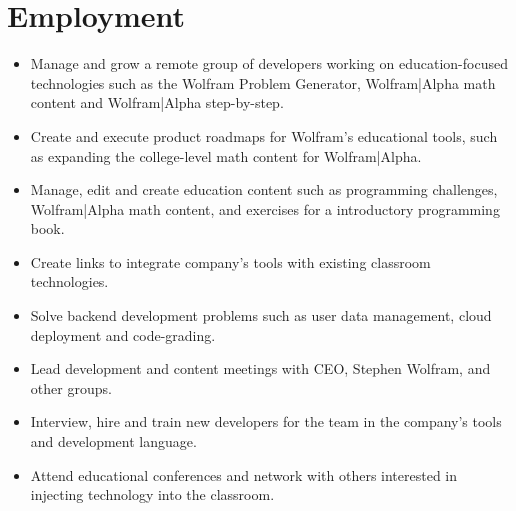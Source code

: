 \documentclass[11pt,a4paper,unicode]{moderncv}
\begin{document}
\vspace*{-6mm}
\maketitle
\vspace*{-6mm}

\section{Employment}

\cvline{}
{\begin{itemize} 
	  \item Manage and grow a remote group of developers working on education-focused technologies such as the Wolfram Problem Generator, Wolfram|Alpha math content and Wolfram|Alpha step-by-step. 
	  \item Create and execute product roadmaps for Wolfram's educational tools, such as expanding the college-level math content for Wolfram|Alpha.
	  \item Manage, edit and create education content such as programming challenges, Wolfram|Alpha math content, and exercises for a introductory programming book. 
	  \item Create links to integrate company's tools with existing classroom technologies.
	  \item Solve backend development problems such as user data management, cloud deployment and code-grading. 
	  \item Lead development and content meetings with CEO, Stephen Wolfram, and other groups.
	  \item Interview, hire and train new developers for the team in the company's tools and development language. 
	  \item Attend educational conferences and network with others interested in injecting technology into the classroom. 
 \end{itemize}}
	 
\vspace{-.5cm}
\end{document}
